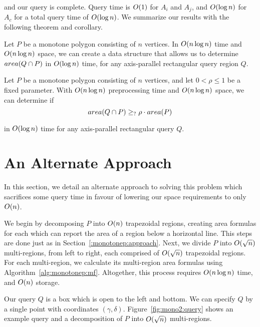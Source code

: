\noindent 
and our query is complete. Query time is $O\!\left(1\right)$ for $A_i$ and $A_j$, and $O\!\left(\log{n}\right)$ for $A_c$ for a total query time of $O\!\left(\log{n}\right)$. We summarize our results with the following theorem and corollary.

\begin{theorem}
\label{th:monotonep:rect:area}
Let $P$ be a monotone polygon consisting of $n$ vertices. In $O\!\left(n \log{n}\right)$ time and $O\!\left(n \log{n}\right)$ space, we can create a data structure that allows us to determine $area(Q \cap P)$ in $O\!\left(\log{n}\right)$ time, for any axis-parallel rectangular query region $Q$.
\end{theorem}

\begin{corollary}
\label{cor:monotonep:rect:mp}
Let $P$ be a monotone polygon consisting of $n$ vertices, and let $0 < \rho \leq 1$ be a fixed parameter. With $O\!\left(n \log{n}\right)$ preprocessing time and $O\!\left(n \log{n}\right)$ space, we can determine if
\[ 
area(Q \cap P) \geq_{?} \rho \cdot area(P) 
\] 

\noindent in $O\!\left(\log{n}\right)$ time for any axis-parallel rectangular query $Q$.
\end{corollary}


\section{An Alternate Approach}
\label{:monotonep:alt}

In this section, we detail an alternate approach to solving this problem which sacrifices some query time in favour of lowering our space requirements to only $O\!\left(n\right)$.

We begin by decomposing $P$ into $O\!\left(n\right)$ trapezoidal regions, creating area formulas for each which can report the area of a region below a horizontal line.  
This steps are done just as in Section~\ref{:monotonep:approach}.  
Next, we divide $P$ into $O\!\left(\sqrt{n}\right)$ multi-regions, from left to right, each comprised of $O\!\left(\sqrt{n}\right)$ trapezoidal regions.
For each multi-region, we calculate its multi-region area formulas using Algorithm~\ref{alg:monotonep:mf}.  
Altogether, this process requires $O\!\left(n\log{n}\right)$ time, and $O\!\left(n\right)$ storage.

Our query $Q$ is a box which is open to the left and bottom.
We can specify $Q$ by a single point with coordinates $(\gamma, \delta)$.  
Figure~\ref{fig:mono2:query} shows an example query and a decomposition of $P$ into $O\!\left(\sqrt{n}\right)$ multi-regions.

